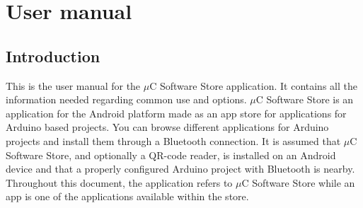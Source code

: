\chapter{User manual}
	\section{Introduction}
		This is the user manual for the $\mu$C Software Store application. It contains all the information needed regarding common use and options. $\mu$C Software Store is an application for the Android platform made as an app store for applications for Arduino based projects. You can browse different applications for Arduino projects and install them through a Bluetooth connection. It is assumed that $\mu$C Software Store, and optionally a QR-code reader, is installed on an Android device and that a properly configured Arduino project with Bluetooth is nearby.\\
		\newline
		Throughout this document, the application refers to $\mu$C Software Store while an app is one of the applications available within the store.
		\newpage
